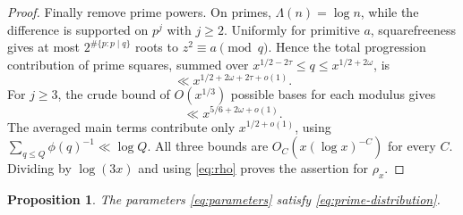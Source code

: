 \documentclass[11pt,reqno]{amsart}
\newtheorem{proposition}[theorem]{Proposition}
\theoremstyle{definition}
\theoremstyle{remark}
\numberwithin{equation}{section}
\begin{document}
\begin{proof}
Finally remove prime powers.  On primes,
$\Lambda(n)=\log n$, while the difference is supported on $p^j$ with
$j\ge2$.  Uniformly for primitive $a$, squarefreeness gives at most
$2^{\#\{p:p\mid q\}}$ roots to $z^2\equiv a\pmod q$.  Hence the total progression
contribution of prime squares, summed over
$x^{1/2-2\tau}\le q\le x^{1/2+2\omega}$, is
\[
 \ll x^{1/2+2\omega+2\tau+o(1)}.
\]
For $j\ge3$, the crude bound of $O(x^{1/3})$ possible bases for each
modulus gives
\[
 \ll x^{5/6+2\omega+o(1)}.
\]
The averaged main terms contribute only $x^{1/2+o(1)}$, using
$\sum_{q\le Q}\phi(q)^{-1}\ll\log Q$.  All three bounds are
$O_C(x(\log x)^{-C})$ for every $C$.  Dividing by $\log(3x)$ and using
\eqref{eq:rho} proves the assertion for $\rho_x$.
\end{proof}

\begin{proposition}\label{prop:distribution}
The parameters \eqref{eq:parameters} satisfy
\eqref{eq:prime-distribution}.
\end{proposition}
\end{document}
